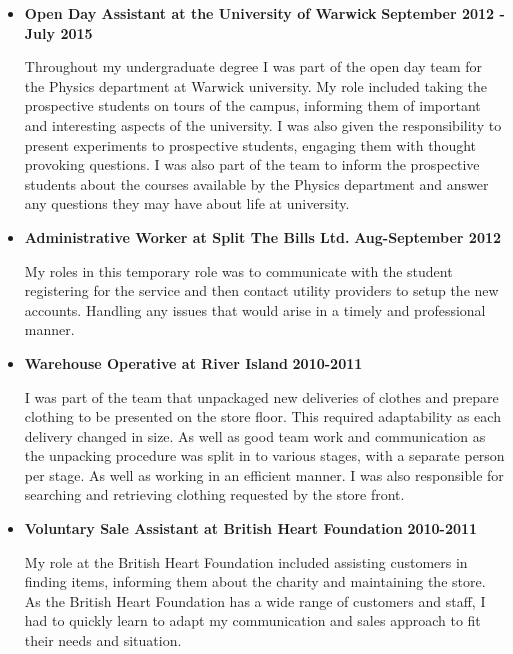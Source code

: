 \documentclass[10pt]{article}
\begin{document}
\begin{itemize}
\item
  \textbf{Open Day Assistant at the University of Warwick}
  \hfill \textbf{September 2012 - July 2015}

  Throughout my undergraduate degree I was part of the open day team for
  the Physics department at Warwick university. My role included taking
  the prospective students on tours of the campus, informing them of
  important and interesting aspects of the university. I was also given
  the responsibility to present experiments to prospective students,
  engaging them with thought provoking questions. I was also part of the
  team to inform the prospective students about the courses available by
  the Physics department and answer any questions they may have about
  life at university.
\item
  \textbf{Administrative Worker at Split The Bills Ltd.}
  \hfill \textbf{Aug-September 2012}

  My roles in this temporary role was to communicate with the student
  registering for the service and then contact utility providers to
  setup the new accounts. Handling any issues that would arise in a
  timely and professional manner.
\item
  \textbf{Warehouse Operative at River Island} \hfill \textbf{2010-2011}

  I was part of the team that unpackaged new deliveries of clothes and
  prepare clothing to be presented on the store floor. This required
  adaptability as each delivery changed in size. As well as good team
  work and communication as the unpacking procedure was split in to
  various stages, with a separate person per stage. As well as working
  in an efficient manner. I was also responsible for searching and
  retrieving clothing requested by the store front.
\item
  \textbf{Voluntary Sale Assistant at British Heart Foundation}
  \hfill \textbf{ 2010-2011}

  My role at the British Heart Foundation included assisting customers
  in finding items, informing them about the charity and maintaining the
  store. As the British Heart Foundation has a wide range of customers
  and staff, I had to quickly learn to adapt my communication and sales
  approach to fit their needs and situation.
\end{itemize}
\end{document}
